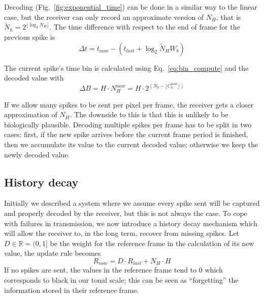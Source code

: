 \documentclass[conference]{IEEEtran}
\begin{document}
Decoding (Fig.~\ref{fig:exponential_time}) can be done in a similar way to the linear case, but the receiver can only record an approximate version of $N_{H}$, that is $\tilde{N}_{h} = 2^{\lfloor\log_2 N_{H}\rfloor}$. The time difference with respect to the end of frame for the previous spike is
\begin{equation}
\Delta t = t_{now} - \left( t_{last} + \log_{2}\tilde{N}_{H}W_{b} \right)
\label{eq:time_diff_exp}
\end{equation}

The current spike's time bin is calculated using Eq.~\ref{eq:bin_compute} and the decoded value with
\begin{equation}
\Delta B = H\cdot N_{H}^{now} = H\cdot 2^{ \left( N_{b} - \lfloor C^{now}_{b}\rfloor  \right)}
\label{eq:new_Nh_exp}
\end{equation}

If we allow many spikes to be sent per pixel per frame, the receiver gets a closer approximation of $N_{H}$. The downside to this is that this is unlikely to be biologically plausible. Decoding multiple spikes per frame has to be split in two cases: first, if the new spike arrives before the current frame period is finished, then we accumulate its value to the current decoded value; otherwise we keep the newly decoded value. 



\subsection{History decay} %
\label{sec:hist_decay}
Initially we described a system where we assume every spike sent will be captured and properly decoded by the receiver, but this is not always the case. To cope with failures in transmission, we now introduce a history decay mechanism which will allow the receiver to, in the long term, recover from missing spikes. Let $D \in \mathbb{R} = (0, 1]$ be the weight for the reference frame in the calculation of its new value, the update rule becomes
\begin{equation}
\label{eq:ref_update_decay}
R_{now} = D\cdot R_{last} + N_{H}\cdot H
\end{equation}
If no spikes are sent, the values in the reference frame tend to 0 which corresponds to black in our tonal scale; this can be seen as ``forgetting'' the information stored in their reference frame.
%
\end{document}
